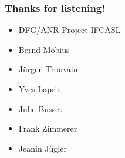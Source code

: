 \documentclass[xcolor={dvipsnames}]{beamer}
\begin{document}
{ 
\begin{frame}[noframenumbering]
\frametitle{Thanks for listening!}
 {\small   {}}
 
 \begin{itemize}
 \item DFG/ANR Project IFCASL
 \item Bernd M\"{o}bius
 \item J\"{u}rgen Trouvain
 \item Yves Laprie
 \item Julie Busset
 \item Frank Zimmerer
 \item Jeanin J\"{u}gler
 \end{itemize}
\end{frame}
}
\end{document}
